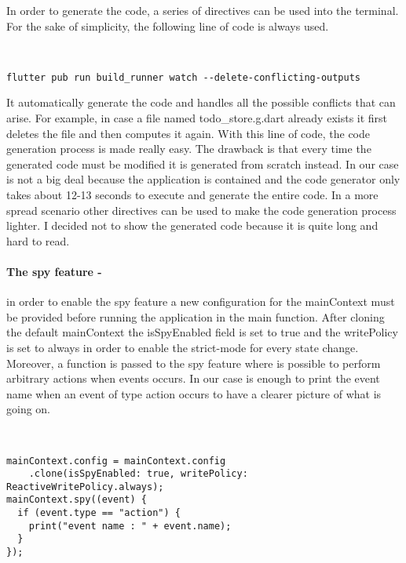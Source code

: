 In order to generate the code, a series of directives can be used into the terminal. For the sake of simplicity, the following line of code is always used.
\begin{code}
\mbox{}\\
 \mbox{}
		\label{code:2.14}
\begin{verbatim}
flutter pub run build_runner watch --delete-conflicting-outputs
\end{verbatim}
\mbox{}
\end{code}

It automatically generate the code and handles all the possible conflicts that can arise. For example, in case a file named todo\_store.g.dart already exists it first deletes the file and then computes it again. With this line of code, the code generation process is made really easy. The drawback is that every time the generated code must be modified it is generated from scratch instead. In our case is not a big deal because the application is contained and the code generator only takes about 12-13 seconds to execute and generate the entire code. In a more spread scenario other directives can be used to make the code generation process lighter. I decided not to show the generated code because it is quite long and hard to read.

\paragraph{The spy feature - }
\label{subpar:todo_app_bloc_core_state} in order to enable the spy feature a new configuration for the mainContext must be provided before running the application in the main function. After cloning the default mainContext the isSpyEnabled field is set to true and the writePolicy is set to always in order to enable the strict-mode for every state change. Moreover, a function is passed to the spy feature where is possible to perform arbitrary actions when events occurs. In our case is enough to print the event name when an event of type action occurs to have a clearer picture of what is going on.

\begin{code}
\mbox{}\\
 \mbox{}
		\label{code:2.14}
\begin{verbatim}
mainContext.config = mainContext.config
    .clone(isSpyEnabled: true, writePolicy: ReactiveWritePolicy.always);
mainContext.spy((event) {
  if (event.type == "action") {
    print("event name : " + event.name);
  }
});
\end{verbatim}
\mbox{}
\end{code}


